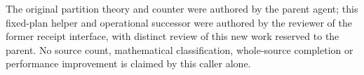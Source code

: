 \documentclass[11pt,a4paper]{article}
\begin{document}
The original partition theory and counter were authored by the parent
agent; this fixed-plan helper and operational successor were authored by
the reviewer of the former receipt interface, with distinct review of
this new work reserved to the parent. No source count, mathematical
classification, whole-source completion or performance improvement is
claimed by this caller alone.
\end{document}
